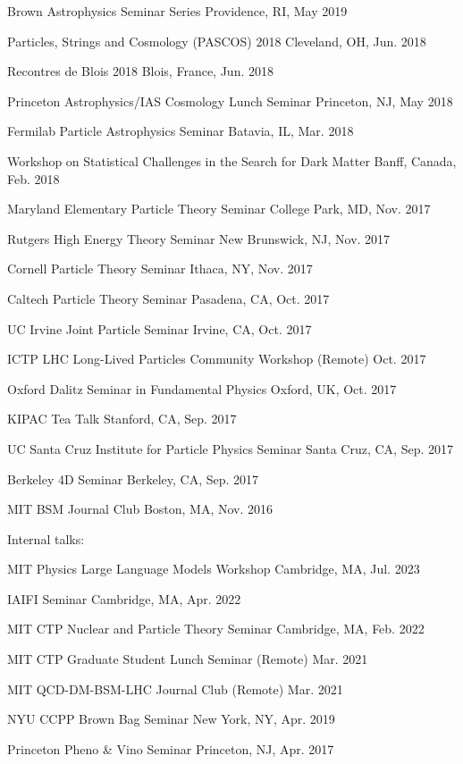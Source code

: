 \documentclass[letterpaper,11pt]{article}
\newenvironment{packed_itemize}{
\begin{itemize}[label=\raisebox{0.25ex}{\tiny$\bullet$}]
  \setlength{\itemsep}{4.2pt}
  \setlength{\parskip}{0pt}
  \setlength{\parsep}{0pt}}{\end{itemize}
}
\begin{document}
\begin{packed_itemize}
  \item Brown Astrophysics Seminar Series \hfill Providence, RI, May 2019
  \item Particles, Strings and Cosmology (PASCOS) 2018 \hfill Cleveland, OH, Jun. 2018
  \item Recontres de Blois 2018 \hfill Blois, France, Jun. 2018
  \item Princeton Astrophysics/IAS Cosmology Lunch Seminar \hfill Princeton, NJ, May 2018
  \item Fermilab Particle Astrophysics Seminar \hfill Batavia, IL, Mar. 2018
  \item Workshop on Statistical Challenges in the Search for Dark Matter \hfill Banff, Canada, Feb. 2018
  \item Maryland Elementary Particle Theory Seminar \hfill College Park, MD, Nov. 2017
  \item Rutgers High Energy Theory Seminar \hfill New Brunswick, NJ, Nov. 2017
  \item Cornell Particle Theory Seminar \hfill Ithaca, NY, Nov. 2017
  \item Caltech Particle Theory Seminar \hfill Pasadena, CA, Oct. 2017
  \item UC Irvine Joint Particle Seminar \hfill Irvine, CA, Oct. 2017
  \item ICTP LHC Long-Lived Particles Community Workshop (Remote) \hfill Oct. 2017
  \item Oxford Dalitz Seminar in Fundamental Physics  \hfill Oxford, UK, Oct. 2017
  \item KIPAC Tea Talk  \hfill Stanford, CA, Sep. 2017
  \item UC Santa Cruz Institute for Particle Physics Seminar  \hfill Santa Cruz, CA, Sep. 2017
  \item Berkeley 4D Seminar  \hfill Berkeley, CA, Sep. 2017
  \item MIT BSM Journal Club \hfill Boston, MA, Nov. 2016
\end{packed_itemize}

\noindent
Internal talks:
\begin{packed_itemize}
  \item MIT Physics Large Language Models Workshop \hfill Cambridge, MA, Jul. 2023
  \item IAIFI Seminar \hfill Cambridge, MA, Apr. 2022
  \item MIT CTP Nuclear and Particle Theory Seminar \hfill Cambridge, MA, Feb. 2022
  \item MIT CTP Graduate Student Lunch Seminar (Remote) \hfill Mar. 2021
  \item MIT QCD-DM-BSM-LHC Journal Club (Remote) \hfill Mar. 2021
  \item NYU CCPP Brown Bag Seminar \hfill New York, NY, Apr. 2019
  \item Princeton Pheno \& Vino Seminar \hfill Princeton, NJ, Apr. 2017
\end{packed_itemize}
\end{document}
